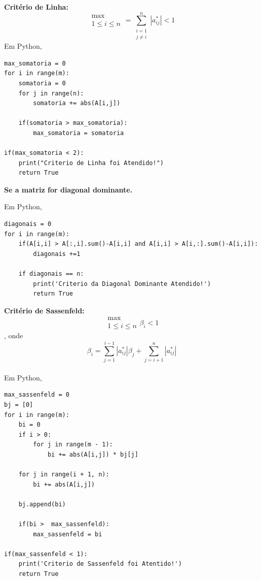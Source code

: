 \documentclass[
12pt,				%
openright,			%
twoside,			%
a4paper,			%
english,			%
french,				%
spanish,			%
brazil				%
]{abntex2_new}
\begin{document}
		
		\begin{alineas}
			\item{\textbf{Critério de Linha:}
				$$\substack{\max \\ 1 \leq i \leq n} = \sum_{\substack{i = 1 \\ j \neq i}}^{n}
				|a_{ij}^{*} | < 1 $$
				Em Python,
				\begin{lstlisting}
max_somatoria = 0
for i in range(m):
	somatoria = 0
	for j in range(n):
		somatoria += abs(A[i,j])

	if(somatoria > max_somatoria):
		max_somatoria = somatoria

if(max_somatoria < 2): 
	print("Criterio de Linha foi Atendido!")
	return True\end{lstlisting}
			}
			
			\item{\textbf{Se a matriz for diagonal dominante.}
				
				Em Python,
				\begin{lstlisting}
diagonais = 0
for i in range(m):
	if(A[i,i] > A[:,i].sum()-A[i,i] and A[i,i] > A[i,:].sum()-A[i,i]):
		diagonais +=1
				
	if diagonais == n:
		print('Criterio da Diagonal Dominante Atendido!')
		return True\end{lstlisting}
				
				
				
			}
			\item{\textbf{Critério de Sassenfeld:}
				$$\substack{\max \\ 1 \leq i \leq n}  \beta_i < 1 $$\hspace{25pt}, onde
				$$\beta_i = \sum_{j=1}^{i-1} |a_{ij}^{*} | \beta_j + \sum_{j = i + 1}^{n}  |
				a_{ij}^{*}|$$\\
				
				Em Python,
				\begin{lstlisting}
max_sassenfeld = 0
bj = [0]
for i in range(m):
	bi = 0
	if i > 0:
		for j in range(m - 1):
			bi += abs(A[i,j]) * bj[j]

	for j in range(i + 1, n):
		bi += abs(A[i,j])

	bj.append(bi)

	if(bi >  max_sassenfeld):
		max_sassenfeld = bi

if(max_sassenfeld < 1):
	print('Criterio de Sassenfeld foi Atentido!')
	return True\end{lstlisting}  
			}
		\end{alineas}
		
		
		
\end{document}
